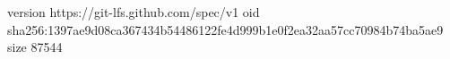 version https://git-lfs.github.com/spec/v1
oid sha256:1397ae9d08ca367434b54486122fe4d999b1e0f2ea32aa57cc70984b74ba5ae9
size 87544
